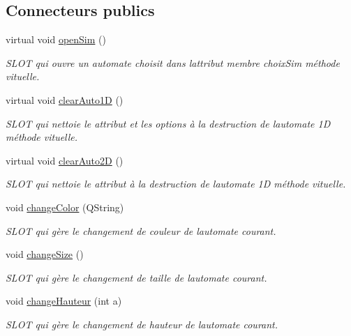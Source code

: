 \subsection*{Connecteurs publics}
\begin{DoxyCompactItemize}
\item 
virtual void \hyperlink{class_main_window_a13e1e518cda3c3ef508f319e5230a425}{open\+Sim} ()
\begin{DoxyCompactList}\small\item\em S\+L\+OT qui ouvre un automate choisit dans l\textquotesingle{}attribut membre choix\+Sim méthode vituelle. \end{DoxyCompactList}\item 
virtual void \hyperlink{class_main_window_a990d78b7f127395e17c2772d751052aa}{clear\+Auto1D} ()
\begin{DoxyCompactList}\small\item\em S\+L\+OT qui nettoie le attribut et les options à la destruction de l\textquotesingle{}automate 1D méthode vituelle. \end{DoxyCompactList}\item 
virtual void \hyperlink{class_main_window_a57bb2b74f849477d2033ea02c95d85fc}{clear\+Auto2D} ()
\begin{DoxyCompactList}\small\item\em S\+L\+OT qui nettoie le attribut à la destruction de l\textquotesingle{}automate 1D méthode vituelle. \end{DoxyCompactList}\item 
void \hyperlink{class_main_window_a709661eaabd6f570a8942f66f7c07738}{change\+Color} (Q\+String)
\begin{DoxyCompactList}\small\item\em S\+L\+OT qui gère le changement de couleur de l\textquotesingle{}automate courant. \end{DoxyCompactList}\item 
void \hyperlink{class_main_window_a06ce6c068fd97d586543f7cdd535d23a}{change\+Size} ()
\begin{DoxyCompactList}\small\item\em S\+L\+OT qui gère le changement de taille de l\textquotesingle{}automate courant. \end{DoxyCompactList}\item 
void \hyperlink{class_main_window_ac907dba426762ffbf3a7702af0aba74b}{change\+Hauteur} (int a)
\begin{DoxyCompactList}\small\item\em S\+L\+OT qui gère le changement de hauteur de l\textquotesingle{}automate courant. \end{DoxyCompactList}\item 

\end{DoxyCompactItemize}
